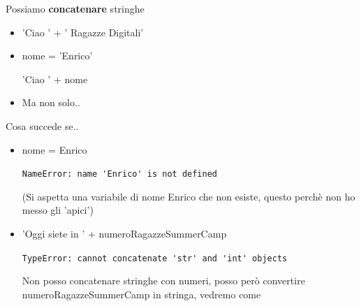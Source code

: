 \begin{frame}{Possiamo \textbf{concatenare} stringhe}
    \begin{itemize}
        \item 'Ciao ' + ' Ragazze Digitali'
        \item nome = 'Enrico'
            
        'Ciao ' + nome
        \item Ma non solo..
    \end{itemize}

	\begin{block}{Cosa succede se..}
        \begin{itemize}
            \item nome = Enrico
            
            \lstinline{NameError: name 'Enrico' is not defined}
            
            (Si aspetta una variabile di nome Enrico che non esiste, questo perchè non ho messo gli 'apici')
            \item 'Oggi siete in ' + numeroRagazzeSummerCamp
            
            \lstinline{TypeError: cannot concatenate 'str' and 'int' objects}
            
            Non posso concatenare stringhe con numeri, posso però convertire numeroRagazzeSummerCamp in stringa, vedremo come
        \end{itemize}
    \end{block}
\end{frame}